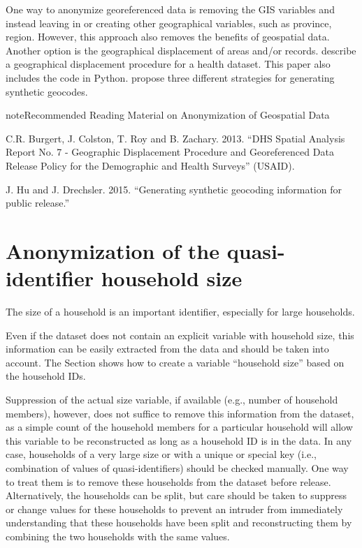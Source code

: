 \documentclass[letterpaper,10pt,english]{sphinxmanual}
\begin{document}
One way to anonymize georeferenced data is removing the GIS variables
and instead leaving in or creating other geographical variables, such as
province, region. However, this approach also removes the benefits of
geospatial data. Another option is the geographical displacement of
areas and/or records. {\hyperref[\detokenize{anon_methods:bcrz13}]{}} describe a geographical
displacement procedure for a health dataset. This paper also includes
the code in Python. {\hyperref[\detokenize{anon_methods:hudr15}]{}} propose three different
strategies for generating synthetic geocodes.

\begin{sphinxadmonition}{note}{Recommended Reading Material on Anonymization of Geospatial Data}

C.R. Burgert, J. Colston, T. Roy and B. Zachary. 2013. “DHS Spatial
Analysis Report No. 7 - Geographic Displacement Procedure and
Georeferenced Data Release Policy for the Demographic and Health
Surveys” (USAID). 

J. Hu and J. Drechsler. 2015. “Generating synthetic geocoding
information for public release.”
\end{sphinxadmonition}


\section{Anonymization of the quasi-identifier household size}
\label{\detokenize{anon_methods:anonymization-of-the-quasi-identifier-household-size}}
The size of a household is an important identifier, especially for large
households. %
\begin{footnote}[22]\sphinxAtStartFootnote
Even if the dataset does not contain an explicit variable with
household size, this information can be easily extracted from the
data and should be taken into account. The Section  shows how to
create a variable “household size” based on the household IDs.
%
\end{footnote}  Suppression of the actual size
variable, if available (e.g., number of household members), however,
does not suffice to remove this information from the dataset, as a
simple count of the household members for a particular household will
allow this variable to be reconstructed as long as a household ID is in
the data. In any case, households of a very large size or with a unique
or special key (i.e., combination of values of quasi-identifiers) should
be checked manually. One way to treat them is to remove these households
from the dataset before release. Alternatively, the households can be
split, but care should be taken to suppress or change values for these
households to prevent an intruder from immediately understanding that
these households have been split and reconstructing them by combining
the two households with the same values.
\end{document}
